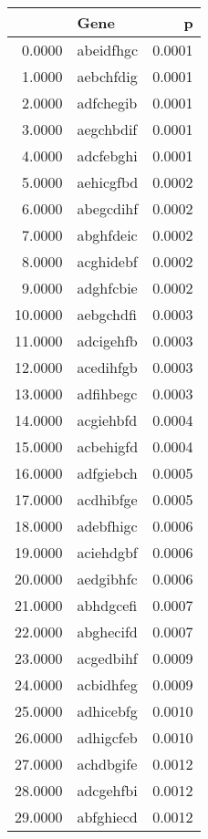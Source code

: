 \begin{tabular}{rlr}
\hline
         & Gene      &      p \\
\hline
  0.0000 & abeidfhgc & 0.0001 \\
  1.0000 & aebchfdig & 0.0001 \\
  2.0000 & adfchegib & 0.0001 \\
  3.0000 & aegchbdif & 0.0001 \\
  4.0000 & adcfebghi & 0.0001 \\
  5.0000 & aehicgfbd & 0.0002 \\
  6.0000 & abegcdihf & 0.0002 \\
  7.0000 & abghfdeic & 0.0002 \\
  8.0000 & acghidebf & 0.0002 \\
  9.0000 & adghfcbie & 0.0002 \\
 10.0000 & aebgchdfi & 0.0003 \\
 11.0000 & adcigehfb & 0.0003 \\
 12.0000 & acedihfgb & 0.0003 \\
 13.0000 & adfihbegc & 0.0003 \\
 14.0000 & acgiehbfd & 0.0004 \\
 15.0000 & acbehigfd & 0.0004 \\
 16.0000 & adfgiebch & 0.0005 \\
 17.0000 & acdhibfge & 0.0005 \\
 18.0000 & adebfhigc & 0.0006 \\
 19.0000 & aciehdgbf & 0.0006 \\
 20.0000 & aedgibhfc & 0.0006 \\
 21.0000 & abhdgcefi & 0.0007 \\
 22.0000 & abghecifd & 0.0007 \\
 23.0000 & acgedbihf & 0.0009 \\
 24.0000 & acbidhfeg & 0.0009 \\
 25.0000 & adhicebfg & 0.0010 \\
 26.0000 & adhigcfeb & 0.0010 \\
 27.0000 & achdbgife & 0.0012 \\
 28.0000 & adcgehfbi & 0.0012 \\
 29.0000 & abfghiecd & 0.0012 \\
\hline
\end{tabular}